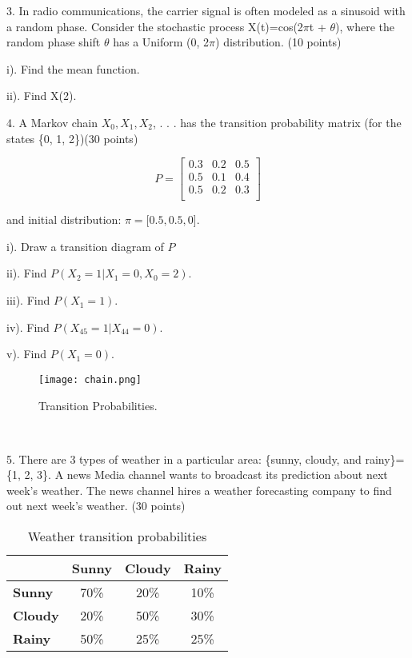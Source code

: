 \documentclass[6pt]{article}
\begin{document}
\vspace{10pt}

3. In radio communications, the carrier signal is often modeled as a sinusoid with a random phase. Consider the stochastic process 
X(t)=cos(2$\pi$t + $\theta$), where the random phase shift $\theta$ has a Uniform (0, 2$\pi$) distribution. (10 points)

\vspace{10pt}

i). Find the mean function.

ii). Find X(2).

\vspace{800pt}

4. A Markov chain $X_0, X_1, X_2$, . . . has the transition probability matrix (for the states \{0, 1, 2\})(30 points)

\[
   P=
  \left[ {\begin{array}{ccc}
   0.3 & 0.2 & 0.5\\
   0.5 & 0.1 & 0.4\\
   0.5 & 0.2 & 0.3\\
  \end{array} } \right]
\]

and initial distribution: $\pi = [0.5, 0.5, 0$]. 
\vspace{10pt}

i). Draw a transition diagram of $P$

ii). Find  $P(X_2 = 1 | X_1 = 0, X_0 = 2)$.

iii). Find  $P(X_1 = 1)$.

iv). Find  $P(X_{45} = 1 | X_{44} = 0)$.

v). Find  $P(X_1 = 0)$.

\begin{figure}
  \centering
  \texttt{[image: chain.png]}
  \caption{Transition Probabilities.}
  \label{fig:chain}
\end{figure}

\vspace{1200pt}

\newpage
\thispagestyle{empty}
~
\newpage

5. There are 3 types of weather in a particular area: \{sunny, cloudy, and rainy\}=\{1, 2, 3\}. A news Media channel wants to broadcast its prediction about next week's weather. The news channel hires a weather forecasting company to find out next week's weather. (30 points)



\begin{table}[h!]
\centering
\begin{tabular}{lccc}
\toprule
\textbf{       } &\textbf{Sunny} & \textbf{Cloudy} & \textbf{Rainy} \\
\midrule
\textbf{Sunny} & 70\% & 20\% & 10\% \\
\textbf{Cloudy} & 20\% & 50\% & 30\% \\
\textbf{Rainy} & 50\% & 25\% & 25\% \\
\bottomrule
\end{tabular}
\caption{Weather transition probabilities}
\end{table}
\end{document}

